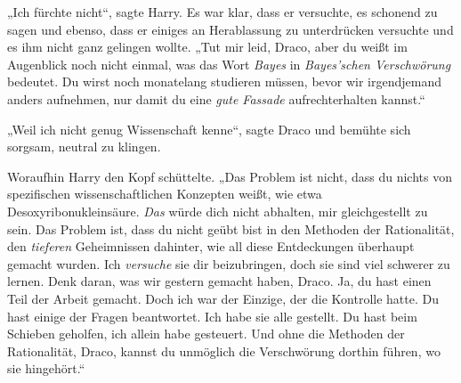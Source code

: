 „Ich fürchte nicht“, sagte Harry. Es war klar, dass er versuchte, es schonend zu sagen und ebenso, dass er einiges an Herablassung zu unterdrücken versuchte und es ihm nicht ganz gelingen wollte.
„Tut mir leid, Draco, aber du weißt im Augenblick noch nicht einmal, was das Wort \emph{Bayes} in \emph{Bayes’schen Verschwörung} bedeutet. Du wirst noch monatelang studieren müssen, bevor wir irgendjemand anders aufnehmen, nur damit du eine \emph{gute Fassade} aufrechterhalten kannst.“

„Weil ich nicht genug Wissenschaft kenne“, sagte Draco und bemühte sich sorgsam, neutral zu klingen.

Woraufhin Harry den Kopf schüttelte.
„Das Problem ist nicht, dass du nichts von spezifischen wissenschaftlichen Konzepten weißt, wie etwa Desoxyribonukleinsäure. \emph{Das} würde dich nicht abhalten, mir gleichgestellt zu sein. Das Problem ist, dass du nicht geübt bist in den Methoden der Rationalität, den \emph{tieferen} Geheimnissen dahinter, wie all diese Entdeckungen überhaupt gemacht wurden. Ich \emph{versuche} sie dir beizubringen, doch sie sind viel schwerer zu lernen. Denk daran, was wir gestern gemacht haben, Draco. Ja, du hast einen Teil der Arbeit gemacht. Doch ich war der Einzige, der die Kontrolle hatte. Du hast einige der Fragen beantwortet. Ich habe sie alle gestellt. Du hast beim Schieben geholfen, ich allein habe gesteuert. Und ohne die Methoden der Rationalität, Draco, kannst du unmöglich die Verschwörung dorthin führen, wo sie hingehört.“

